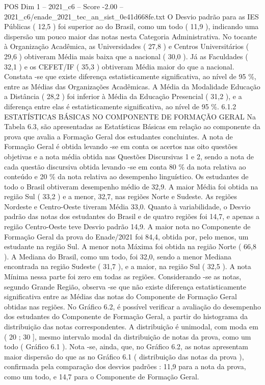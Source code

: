 \begin{textsample}{POS Dim 1 – 2021\_c6 – Score -2.00 – 2021\_c6/enade\_2021\_tec\_an\_sist\_0e41d668fe.txt}
O Desvio padrão para as IES Públicas ( 12,5 ) foi superior ao do Brasil, como um todo ( 11,9 ), indicando uma dispersão um pouco maior das notas nesta Categoria Administrativa.
No tocante à Organização Acadêmica, as Universidades ( 27,8 ) e Centros Universitários ( 29,6 ) obtiveram Média mais baixa que a nacional ( 30,0 ).
Já as Faculdades ( 32,1 ) e os CEFET/IF ( 35,3 ) obtiveram Média maior do que a nacional.
Constata -se que existe diferença estatisticamente significativa, ao nível de 95 \%, entre as Médias das Organizações Acadêmicas.
A Média da Modalidade Educação a Distância ( 28,2 ) foi inferior à Média da Educação Presencial ( 31,2 ), e a diferença entre elas é estatisticamente significativa, ao nível de 95 \%. 6.1.2 ESTATÍSTICAS BÁSICAS NO COMPONENTE DE FORMAÇÃO GERAL Na Tabela 6.3, são apresentadas as Estatísticas Básicas em relação ao componente da prova que avalia a Formação Geral dos estudantes concluintes.
A nota de Formação Geral é obtida levando -se em conta os acertos nas oito questões objetivas e a nota média obtida nas Questões Discursivas 1 e 2, sendo a nota de cada questão discursiva obtida levando -se em conta 80 \% da nota relativa ao conteúdo e 20 \% da nota relativa ao desempenho linguístico.
Os estudantes de todo o Brasil obtiveram desempenho médio de 32,9.
A maior Média foi obtida na região Sul ( 33,2 ) e a menor, 32,7, nas regiões Norte e Sudeste.
As regiões Nordeste e Centro-Oeste tiveram Média 33,0.
Quanto à variabilidade, o Desvio padrão das notas dos estudantes do Brasil e de quatro regiões foi 14,7, e apenas a região Centro-Oeste teve Desvio padrão 14,9.
A maior nota no Componente de Formação Geral da prova do Enade/2021 foi 84,4, obtida por, pelo menos, um estudante na região Sul.
A menor nota Máxima foi obtida na região Norte ( 66,8 ).
A Mediana do Brasil, como um todo, foi 32,0, sendo a menor Mediana encontrada na região Sudeste ( 31,7 ), e a maior, na região Sul ( 32,5 ).
A nota Mínima nessa parte foi zero em todas as regiões.
Considerando -se as notas, segundo Grande Região, observa -se que não existe diferença estatisticamente significativa entre as Médias das notas do Componente de Formação Geral obtidas nas regiões.
No Gráfico 6.2, é possível verificar a avaliação do desempenho dos estudantes do Componente de Formação Geral, a partir do histograma da distribuição das notas correspondentes.
A distribuição é unimodal, com moda em ( 20 ; 30 ], mesmo intervalo modal da distribuição de notas da prova, como um todo ( Gráfico 6.1 ).
Nota -se, ainda, que, no Gráfico 6.2, as notas apresentam maior dispersão do que as no Gráfico 6.1 ( distribuição das notas da prova ), confirmada pela comparação dos desvios padrões : 11,9 para a nota da prova, como um todo, e 14,7 para o Componente de Formação Geral.

\end{textsample}
